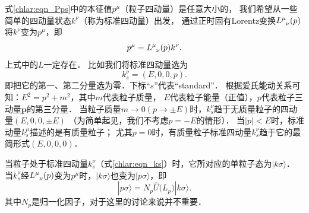 式\eqref{chlar:eqn_Pps}中的本征值$p^\mu$（粒子四动量）是任意大小的，
我们希望从一些简单的四动量状态$k^\nu$（称为{\heiti 标准四动量}）出发，
通过正时固有Lorentz变换$L^\mu_{\hphantom{\mu}\nu}(p)$将$k^\nu$变为$p^\mu$，即
\begin{equation}\label{chlar:eqn_pLk}
	p^\mu = L^\mu_{\hphantom{\mu}\nu}(p) k^\nu .
\end{equation}
上式中的$L$一定存在．
比如我们将标准四动量选为
\begin{equation}\label{chlar:eqn_ks}
	k^\nu_{s}=(E,0,0,p).
\end{equation}
即把它的第一、第二分量选为零．下标“$s$”代表“standard”．
根据爱氏能动关系可知：$E^2=p^2+m^2$，其中$m$代表粒子质量，
$E$代表粒子能量（正值），$p$代表粒子三动量$\boldsymbol{p}$的第三分量．
当粒子质量$m\to 0(p\to \pm E)$时，$k^\nu_s$趋于无质量粒子的四动量$(E,0,0,\pm E)$
（为简单起见，我们不考虑$p=-E$的情形）．
当$|p| <E$时，标准动量$k^\mu_s$描述的是有质量粒子；
尤其$p=0$时，有质量粒子标准四动量$k^\nu_{s}$趋于它的最简形式$(E,0,0,0)$．

当粒子处于标准四动量$k^\nu_s$（式\eqref{chlar:eqn_ks}）时，它所对应的单粒子态为$|k\sigma\rangle$．
当$k^\nu_s$经$L^\mu_{\hphantom{\mu}\nu}(p)$变为$p^\mu$时，$|k\sigma\rangle$也变为$|p\sigma\rangle$，即
\begin{equation}\label{chlar:eqn_pULk}
	|p\sigma\rangle = N_p \hat{U}\bigl(L_p\bigr) |k\sigma\rangle.
\end{equation}
其中$N_p$是归一化因子，对于这里的讨论来说并不重要．

